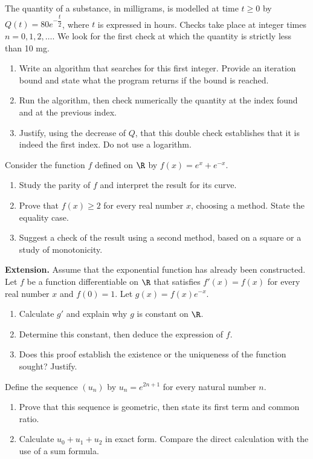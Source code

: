 The quantity of a substance, in milligrams, is modelled at time $t\geq0$ by $Q(t)=80e^{-\dfrac{t}{2}}$, where $t$ is expressed in hours. Checks take place at integer times $n=0,1,2,\ldots$. We look for the first check at which the quantity is strictly less than 10 mg.
\begin{enumerate}[label=\arabic*.]
\item Write an algorithm that searches for this first integer. Provide an iteration bound and state what the program returns if the bound is reached.
\item Run the algorithm, then check numerically the quantity at the index found and at the previous index.
\item Justify, using the decrease of $Q$, that this double check establishes that it is indeed the first index. Do not use a logarithm.
\end{enumerate}
Consider the function $f$ defined on $\R$ by $f(x)=e^x+e^{-x}$.
\begin{enumerate}[label=\arabic*.]
\item Study the parity of $f$ and interpret the result for its curve.
\item Prove that $f(x)\geq2$ for every real number $x$, choosing a method. State the equality case.
\item Suggest a check of the result using a second method, based on a square or a study of monotonicity.
\end{enumerate}
\textbf{Extension.} Assume that the exponential function has already been constructed. Let $f$ be a function differentiable on $\R$ that satisfies $f\prime(x)=f(x)$ for every real number $x$ and $f(0)=1$. Let $g(x)=f(x)e^{-x}$.
\begin{enumerate}[label=\arabic*.]
\item Calculate $g\prime$ and explain why $g$ is constant on $\R$.
\item Determine this constant, then deduce the expression of $f$.
\item Does this proof establish the existence or the uniqueness of the function sought? Justify.
\end{enumerate}
Define the sequence $(u_n)$ by $u_n=e^{2n+1}$ for every natural number $n$.
\begin{enumerate}[label=\arabic*.]
\item Prove that this sequence is geometric, then state its first term and common ratio.
\item Calculate $u_0+u_1+u_2$ in exact form. Compare the direct calculation with the use of a sum formula.
\end{enumerate}
